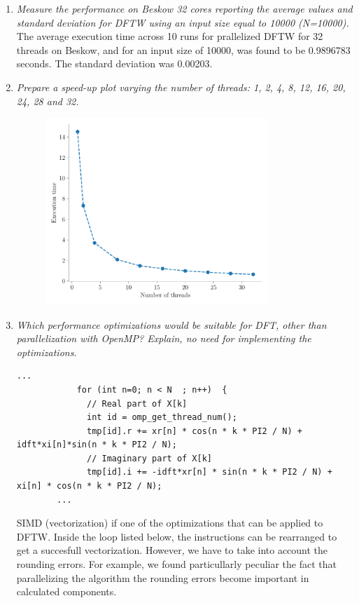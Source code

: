 \documentclass[12pt]{article}
\begin{document}
\begin{enumerate}
    \item \textit{Measure the performance on Beskow 32 cores reporting the average values and standard deviation for DFTW using an input size equal to 10000 (N=10000).}\\
    The average execution time across 10 runs for prallelized DFTW for 32 threads on Beskow, and for an input size of 10000, was found to be 0.9896783 seconds. The standard deviation was 0.00203.
    
    \item \textit{Prepare a speed-up plot varying the number of threads: 1, 2, 4, 8, 12, 16, 20, 24, 28 and 32.}
    \begin{figure}[H]
    \centering
	\includegraphics[width=0.8\textwidth]{dftw.pdf}
	\end{figure}
    
    \item \textit{Which performance optimizations would be suitable for DFT, other than parallelization with OpenMP? Explain, no need for implementing the optimizations.}
	
	\begin{lstlisting}[style=CStyle,firstnumber=119]
		...
			for (int n=0; n < N  ; n++)  {
			  // Real part of X[k]
			  int id = omp_get_thread_num();
			  tmp[id].r += xr[n] * cos(n * k * PI2 / N) + idft*xi[n]*sin(n * k * PI2 / N);
			  // Imaginary part of X[k]
			  tmp[id].i += -idft*xr[n] * sin(n * k * PI2 / N) + xi[n] * cos(n * k * PI2 / N);
		...
			\end{lstlisting}

	SIMD (vectorization) if one of the optimizations that can be applied to DFTW. Inside the loop listed below, the instructions can be rearranged to get a succesfull vectorization. However, we have to take into account the rounding errors. For example, we found particullarly peculiar the fact that parallelizing the algorithm the rounding errors become important in calculated components.
\end{enumerate}
\end{document}
